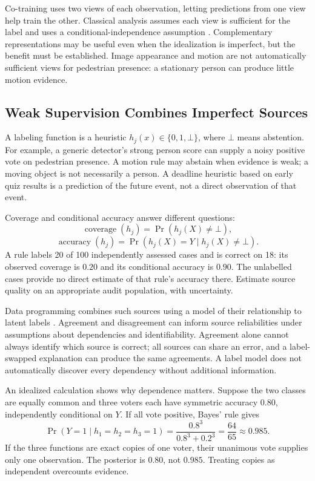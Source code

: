Co-training uses two views of each observation, letting predictions from one view help train the other. Classical analysis assumes each view is sufficient for the label and uses a conditional-independence assumption \citep{blum1998}. Complementary representations may be useful even when the idealization is imperfect, but the benefit must be established. Image appearance and motion are not automatically sufficient views for pedestrian presence: a stationary person can produce little motion evidence.

\subsection{Weak Supervision Combines Imperfect Sources}
\label{subsec:weak-supervision}

A labeling function is a heuristic $h_j(x)\in\{0,1,\bot\}$, where $\bot$ means abstention. For example, a generic detector's strong person score can supply a noisy positive vote on pedestrian presence. A motion rule may abstain when evidence is weak; a moving object is not necessarily a person. A deadline heuristic based on early quiz results is a prediction of the future event, not a direct observation of that event.

Coverage and conditional accuracy answer different questions:
\[
\operatorname{coverage}(h_j)=\Pr(h_j(X)\ne\bot),
\]
\[
\operatorname{accuracy}(h_j)=\Pr(h_j(X)=Y\mid h_j(X)\ne\bot).
\]
A rule labels 20 of 100 independently assessed cases and is correct on 18: its observed coverage is $0.20$ and its conditional accuracy is $0.90$. The unlabelled cases provide no direct estimate of that rule's accuracy there. Estimate source quality on an appropriate audit population, with uncertainty.

Data programming combines such sources using a model of their relationship to latent labels \citep{ratner2016}. Agreement and disagreement can inform source reliabilities under assumptions about dependencies and identifiability. Agreement alone cannot always identify which source is correct; all sources can share an error, and a label-swapped explanation can produce the same agreements. A label model does not automatically discover every dependency without additional information.

An idealized calculation shows why dependence matters. Suppose the two classes are equally common and three voters each have symmetric accuracy $0.80$, independently conditional on $Y$. If all vote positive, Bayes' rule gives
\[
\Pr(Y=1\mid h_1=h_2=h_3=1)
=\frac{0.8^3}{0.8^3+0.2^3}=\frac{64}{65}\approx0.985.
\]
If the three functions are exact copies of one voter, their unanimous vote supplies only one observation. The posterior is $0.80$, not $0.985$. Treating copies as independent overcounts evidence.

